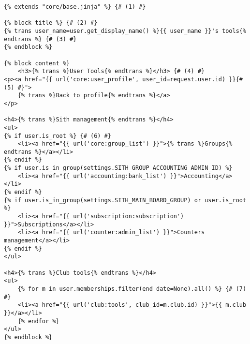 \documentclass[a4paper]{report}
\begin{document}
\begin{addmargin}[-4em]{0em}
    \begin{verbatim}
{% extends "core/base.jinja" %} {# (1) #}

{% block title %} {# (2) #}
{% trans user_name=user.get_display_name() %}{{ user_name }}'s tools{% endtrans %} {# (3) #}
{% endblock %}

{% block content %}
    <h3>{% trans %}User Tools{% endtrans %}</h3> {# (4) #}
<p><a href="{{ url('core:user_profile', user_id=request.user.id) }}{# (5) #}">
    {% trans %}Back to profile{% endtrans %}</a>
</p>

<h4>{% trans %}Sith management{% endtrans %}</h4>
<ul>
{% if user.is_root %} {# (6) #}
    <li><a href="{{ url('core:group_list') }}">{% trans %}Groups{% endtrans %}</a></li>
{% endif %}
{% if user.is_in_group(settings.SITH_GROUP_ACCOUNTING_ADMIN_ID) %}
    <li><a href="{{ url('accounting:bank_list') }}">Accounting</a></li>
{% endif %}
{% if user.is_in_group(settings.SITH_MAIN_BOARD_GROUP) or user.is_root %}
    <li><a href="{{ url('subscription:subscription') }}">Subscriptions</a></li>
    <li><a href="{{ url('counter:admin_list') }}">Counters management</a></li>
{% endif %}
</ul>

<h4>{% trans %}Club tools{% endtrans %}</h4>
<ul>
    {% for m in user.memberships.filter(end_date=None).all() %} {# (7) #}
    <li><a href="{{ url('club:tools', club_id=m.club.id) }}">{{ m.club }}</a></li>
    {% endfor %}
</ul>
{% endblock %}
    \end{verbatim}
\end{addmargin}
\end{document}
